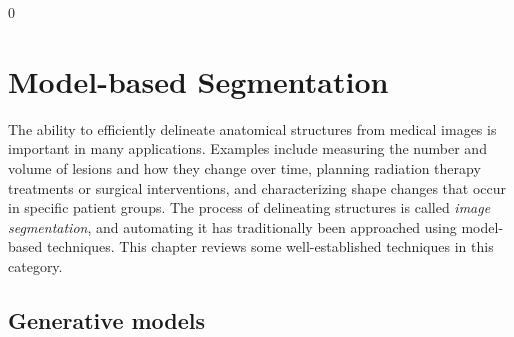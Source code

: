 \documentclass[10pt,twoside]{book}
\def\hideChapterModelBasedSegmentation{0}
\begin{document}
% 
\setcounter{exerciseCounter}{0}
% 
% 
% 



\fi

\if\hideChapterModelBasedSegmentation0


\chapter{Model-based Segmentation}
\label{chap:modelBasedSegmentation}

The ability to efficiently delineate anatomical structures from medical images is important in many applications. Examples include measuring the number and volume of lesions and how they change over time, planning radiation therapy treatments or surgical interventions, and characterizing shape changes that occur in specific patient groups. The process of delineating structures is called \emph{image segmentation}, and automating it has traditionally been approached using model-based techniques. This chapter reviews some well-established techniques in this category.


\section{Generative models}
\end{document}
